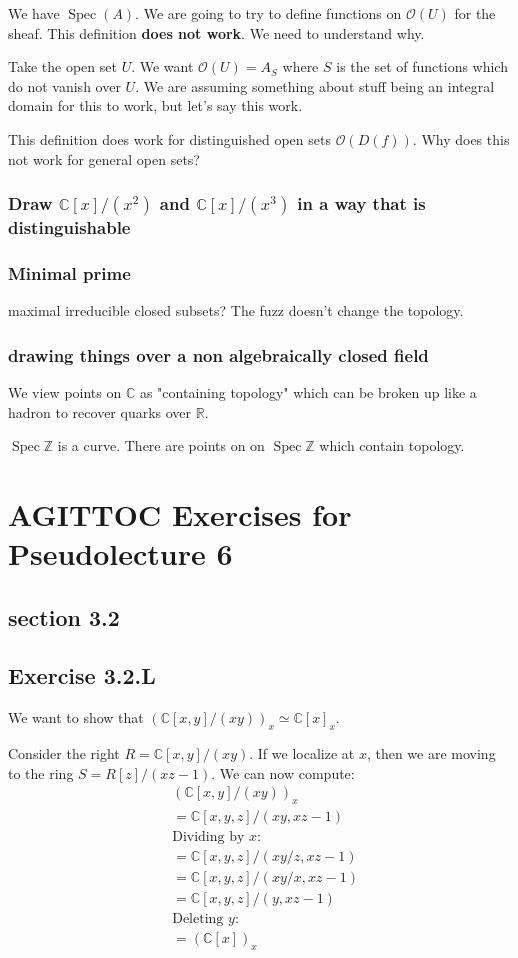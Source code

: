 \documentclass{book}
\newcommand{\Z}{\ensuremath{\mathbb{Z}}}
\newcommand{\C}{\ensuremath{\mathbb{C}}}
\newcommand{\R}{\ensuremath{\mathbb{R}}}
\renewcommand{\O}{\ensuremath{\mathcal{O}}}
\newcommand{\spec}{\operatorname{Spec}}
\theoremstyle{definition}
\begin{document}
We have $\spec(A)$. We are going to try to define functions on $\O(U)$ for the
sheaf. This definition \textbf{does not work}. We need to understand why.


Take the open set $U$. We want $\O(U) = A_{S}$ where $S$ is the set of functions
which do not vanish over $U$. We are assuming something about stuff being
an integral domain for this to work, but let's say this work.

This definition does work for distinguished open sets $\O(D(f))$. Why does this
not work for general open sets?

\subsection{Draw $\C[x]/(x^2)$ and $\C[x]/(x^3)$ in a way that is distinguishable}

\subsection{Minimal prime}
maximal irreducible closed subsets? The fuzz doesn't change the topology. 



\subsection{drawing things over a non algebraically closed field}
We view points on $\C$ as "containing topology" which can be broken
up like a hadron to recover quarks over $\R$.

$\spec \Z$ is a curve. There are points on on $\spec \Z$ which contain
topology.

\chapter{AGITTOC Exercises for Pseudolecture 6}
\section{section 3.2}
\section{Exercise 3.2.L}
We want to show that $(\C[x, y]/(xy))_x \simeq \C[x]_x$.

Consider the right $R = \C[x, y]/(xy)$. If we localize at $x$, then we 
are moving to the ring $S = R[z]/(xz - 1)$. We can now compute:
\begin{align*}
&(\C[x, y]/(xy))_x \\ 
&= \C[x, y, z]/(xy, xz - 1) \\
&\text{Dividing by $x$:} \\
&= \C[x, y, z]/(xy/z, xz - 1) \\
&= \C[x, y, z]/(xy/x, xz - 1) \\
&= \C[x, y, z]/(y, xz - 1) \\
&\text{Deleting $y$:} \\
&= (\C[x])_{x} \\
\end{align*}
\end{document}
